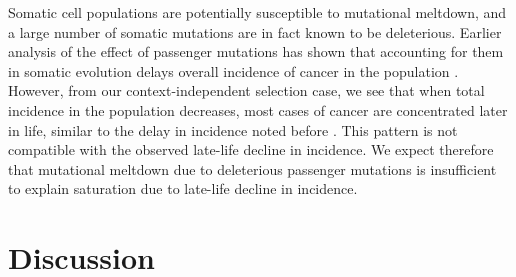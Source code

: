 \documentclass[12pt,onecolumn,twoside]{article}
\begin{document}
Somatic cell populations are potentially susceptible to mutational meltdown, and a large number of somatic mutations are in fact known to be deleterious. Earlier analysis of the effect of passenger mutations has shown that accounting for them in somatic evolution delays overall incidence of cancer in the population \autocite{McFarland2013}. However, from our context-independent selection case, we see that when total incidence in the population decreases, most cases of cancer are concentrated later in life, similar to the delay in incidence noted before \autocite{McFarland2013}. This pattern is not compatible with the observed late-life decline in incidence. We expect therefore that mutational meltdown due to deleterious passenger mutations is insufficient to explain saturation due to late-life decline in incidence.

\section{Discussion}
\end{document}
